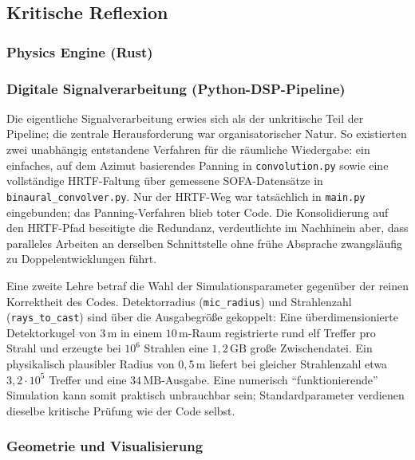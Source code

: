 \documentclass{article}
\begin{document}
\subsection{Kritische Reflexion}
\label{sec:reflexion}

\subsubsection{Physics Engine (Rust)}
\label{sec:reflexion-rust}

\subsubsection{Digitale Signalverarbeitung (Python-DSP-Pipeline)}
\label{sec:reflexion-dsp}
Die eigentliche Signalverarbeitung erwies sich als der unkritische Teil der
Pipeline; die zentrale Herausforderung war organisatorischer Natur. So
existierten zwei unabhängig entstandene Verfahren für die räumliche Wiedergabe:
ein einfaches, auf dem Azimut basierendes Panning in \texttt{convolution.py}
sowie eine vollständige HRTF-Faltung über gemessene SOFA-Datensätze in
\texttt{binaural\_convolver.py}. Nur der HRTF-Weg war tatsächlich in
\texttt{main.py} eingebunden; das Panning-Verfahren blieb toter Code. Die
Konsolidierung auf den HRTF-Pfad beseitigte die Redundanz, verdeutlichte im
Nachhinein aber, dass paralleles Arbeiten an derselben Schnittstelle ohne frühe
Absprache zwangsläufig zu Doppelentwicklungen führt.

Eine zweite Lehre betraf die Wahl der Simulationsparameter gegenüber der reinen
Korrektheit des Codes. Detektorradius (\texttt{mic\_radius}) und Strahlenzahl
(\texttt{rays\_to\_cast}) sind über die Ausgabegröße gekoppelt: Eine
überdimensionierte Detektorkugel von $3\,\text{m}$ in einem $10\,\text{m}$-Raum
registrierte rund elf Treffer pro Strahl und erzeugte bei $10^6$ Strahlen eine
$1{,}2\,\text{GB}$ große Zwischendatei. Ein physikalisch plausibler Radius von
$0{,}5\,\text{m}$ liefert bei gleicher Strahlenzahl etwa $3{,}2\cdot10^{5}$
Treffer und eine $34\,\text{MB}$-Ausgabe. Eine numerisch ``funktionierende''
Simulation kann somit praktisch unbrauchbar sein; Standardparameter verdienen
dieselbe kritische Prüfung wie der Code selbst.

\subsubsection{Geometrie und Visualisierung}
\label{sec:reflexion-geometrie}
\end{document}
